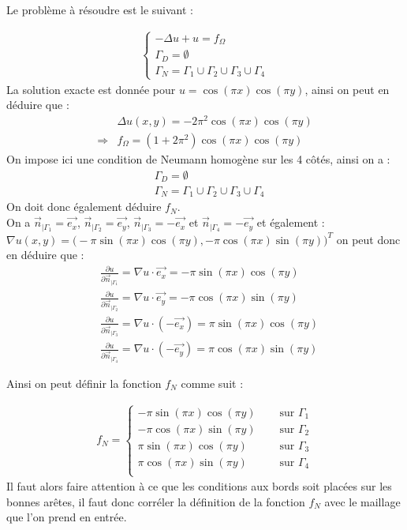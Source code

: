\documentclass[a4paper, 12pt, french]{report}
\begin{document}
Le problème à résoudre est le suivant : 

\begin{align}
    \left\{
    \begin{array}{ll}
        -\Delta u + u = f_\Omega \\
        \Gamma_D = \emptyset\\
        \Gamma_N = \Gamma_1 \cup\Gamma_2 \cup\Gamma_3 \cup\Gamma_4
    \end{array}
    \right.
\end{align}
La solution exacte est donnée pour $u=\cos(\pi x)\cos(\pi y)$, ainsi on peut en déduire que :
\begin{align*}
    &\Delta u(x,y) = -2\pi^2\cos(\pi x)\cos(\pi y)\\
    \Rightarrow &f_\Omega =(1+2\pi^2)\cos(\pi x)\cos(\pi y)
\end{align*}
On impose ici une condition de Neumann homogène sur les 4 côtés, ainsi on a : 
\begin{align*}
    &\Gamma_D = \emptyset\\
    &\Gamma_N = \Gamma_1 \cup\Gamma_2 \cup\Gamma_3 \cup\Gamma_4
\end{align*}
On doit donc également déduire $f_N$.\\
On a $\Vec{n}_{|\Gamma_1} = \Vec{e_x}$, $\Vec{n}_{|\Gamma_2} = \Vec{e_y}$, $\Vec{n}_{|\Gamma_3} = -\Vec{e_x}$ et $\Vec{n}_{|\Gamma_4} = -\Vec{e_y}$ et également :
\\$\nabla u(x,y) = \Big(-\pi \sin(\pi x)\cos(\pi y), -\pi \cos(\pi x)\sin(\pi y) \Big)^T$ on peut donc en déduire que :
\begin{align*}
    &\frac{\partial u}{\partial \Vec{n}_{|\Gamma_1}} = \nabla u \cdot \Vec{e_x} = -\pi \sin(\pi x)\cos(\pi y)\\
    &\frac{\partial u}{\partial \Vec{n}_{|\Gamma_2}} = \nabla u \cdot \Vec{e_y} = -\pi \cos(\pi x)\sin(\pi y)\\
    &\frac{\partial u}{\partial \Vec{n}_{|\Gamma_3}} = \nabla u \cdot (-\Vec{e_x}) = \pi \sin(\pi x)\cos(\pi y)\\
    &\frac{\partial u}{\partial \Vec{n}_{|\Gamma_4}} = \nabla u \cdot (-\Vec{e_y}) = \pi \cos(\pi x)\sin(\pi y)
\end{align*}

Ainsi on peut définir la fonction $f_N$ comme suit :

\begin{align*}
    f_N = \left\{
    \begin{array}{ll}
        -\pi \sin(\pi x)\cos(\pi y)  \quad &\text{ sur $\Gamma_1$}\\
        -\pi \cos(\pi x)\sin(\pi y)\quad &\text{ sur $\Gamma_2$}\\
        \pi \sin(\pi x)\cos(\pi y)\quad &\text{ sur $\Gamma_3$}\\
        \pi \cos(\pi x)\sin(\pi y)\quad &\text{ sur $\Gamma_4$}\\
    \end{array}
    \right.
\end{align*}
Il faut alors faire attention à ce que les conditions aux bords soit placées sur les bonnes arêtes, il faut donc corréler la définition de la fonction $f_N$ avec le maillage que l'on prend en entrée.
\end{document}
